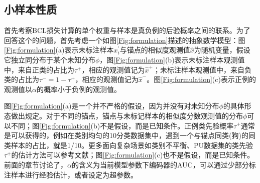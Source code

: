 \subsection{小样本性质}
首先考察BCL损失计算的单个权重与样本是真负例的后验概率之间的联系。为了回答这个的问题，首先考虑一个如图\ref{Fig:formulation}描述的抽象数学模型：图\ref{Fig:formulation}(a)表示未标注样本$x^\prime_i$与锚点的相似度观测值$\hat{x}$为随机变量，假设它独立同分布于某个未知分布$\phi$，图\ref{Fig:formulation}(b)表示未标注样本观测值中，来自正类的占比为$\tau^+$，相应的观测值记为$\hat{x}^+$；未标注样本观测值中，来自负类的占比为$\tau^- = 1-\tau^+$，相应的观测值记为$\hat{x}^-$。图\ref{Fig:formulation}(c)表示正例的观测值以$\alpha$的概率小于负例的观测值。

图\ref{Fig:formulation}(a)是一个并不严格的假设，因为并没有对未知分布$\phi$的具体形态做出规定。对于不同的锚点，锚点与未标记样本的相似度分数观测值的分布$\phi$可以不同；图\ref{Fig:formulation}(b)不是假设，而是已知条件。正例类先验概率$\tau^+$通常是可以获得的，例如在类别均匀的10分类数据集中，遇到一个与锚点同类(狗)的同类样本的占比，就是1/10。更多面向复杂场景如类别不平衡、PU数据集的类先验$\tau^+$的估计方法可以参考文献\cite{Jain:2016:NIPS,Christoffel:2016:ACML}；图\ref{Fig:formulation}(c)也不是假设，而是已知条件。前面的章节讨论了，$\alpha$的含义为当前模型参数下编码器的AUC，可以通过少部分标注样本进行经验估计，或者设定为超参数。


